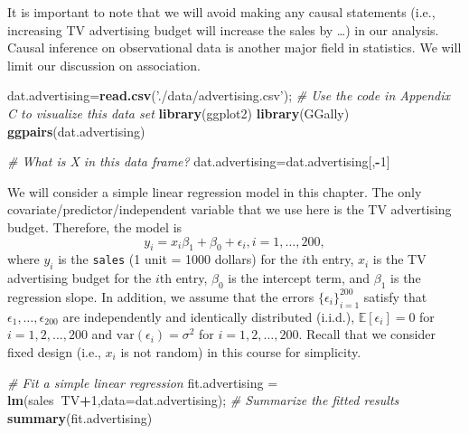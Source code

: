 \documentclass[12pt,]{book}
\newenvironment{Shaded}{\begin{snugshade}}{\end{snugshade}}
\newcommand{\KeywordTok}[1]{\textcolor[rgb]{0.13,0.29,0.53}{\textbf{#1}}}
\newcommand{\DataTypeTok}[1]{\textcolor[rgb]{0.13,0.29,0.53}{#1}}
\newcommand{\DecValTok}[1]{\textcolor[rgb]{0.00,0.00,0.81}{#1}}
\newcommand{\StringTok}[1]{\textcolor[rgb]{0.31,0.60,0.02}{#1}}
\newcommand{\CommentTok}[1]{\textcolor[rgb]{0.56,0.35,0.01}{\textit{#1}}}
\newcommand{\OperatorTok}[1]{\textcolor[rgb]{0.81,0.36,0.00}{\textbf{#1}}}
\newcommand{\NormalTok}[1]{#1}
\begin{document}
It is important to note that we will avoid making any causal statements
(i.e., increasing TV advertising budget will increase the sales by
\ldots{}) in our analysis. Causal inference on observational data is
another major field in statistics. We will limit our discussion on
association.

\begin{Shaded}
\begin{Highlighting}[]
\NormalTok{dat.advertising=}\KeywordTok{read.csv}\NormalTok{(}\StringTok{'./data/advertising.csv'}\NormalTok{);}
\CommentTok{# Use the code in Appendix C to visualize this data set}
\KeywordTok{library}\NormalTok{(ggplot2)}
\KeywordTok{library}\NormalTok{(GGally)}
\KeywordTok{ggpairs}\NormalTok{(dat.advertising)}
\end{Highlighting}
\end{Shaded}

\begin{Shaded}
\begin{Highlighting}[]
\CommentTok{# What is X in this data frame?}
\NormalTok{dat.advertising=dat.advertising[,}\OperatorTok{-}\DecValTok{1}\NormalTok{]}
\end{Highlighting}
\end{Shaded}

We will consider a simple linear regression model in this chapter. The
only covariate/predictor/independent variable that we use here is the TV
advertising budget. Therefore, the model is \[
    y_i = x_i \beta_1  +\beta_0 +  \epsilon_i, i=1,\ldots, 200,
    \] where \(y_i\) is the \texttt{sales} (1 unit = 1000 dollars) for
the \(i\)th entry, \(x_i\) is the TV advertising budget for the \(i\)th
entry, \(\beta_0\) is the intercept term, and \(\beta_1\) is the
regression slope. In addition, we assume that the errors
\(\{\epsilon_i\}_{i=1}^{200}\) satisfy that
\(\epsilon_1,\ldots, \epsilon_200\) are independently and identically
distributed (i.i.d.), \(\mathbb{E}[\epsilon_i]= 0\) for
\(i=1,2,\ldots, 200\) and \(\mathrm{var}(\epsilon_i)=\sigma^2\) for
\(i=1,2,\ldots, 200\). Recall that we consider fixed design (i.e.,
\(x_i\) is not random) in this course for simplicity.

\begin{Shaded}
\begin{Highlighting}[]
\CommentTok{# Fit a simple linear regression}
\NormalTok{fit.advertising =}\StringTok{ }\KeywordTok{lm}\NormalTok{(sales}\OperatorTok{~}\NormalTok{TV}\OperatorTok{+}\DecValTok{1}\NormalTok{,}\DataTypeTok{data=}\NormalTok{dat.advertising); }
\CommentTok{# Summarize the fitted results}
\KeywordTok{summary}\NormalTok{(fit.advertising) }
\end{Highlighting}
\end{Shaded}
\end{document}
